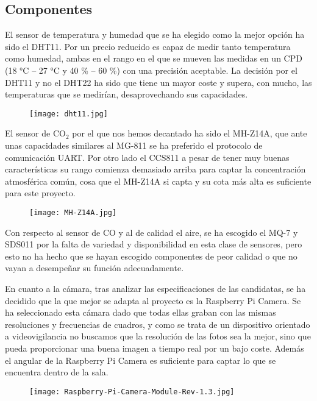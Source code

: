 \subsection{Componentes}\label{subsec:componentes}
El sensor de temperatura y humedad que se ha elegido como la mejor opción ha sido el DHT11. Por un precio reducido es capaz de medir tanto temperatura como humedad, ambas en el rango en el que se mueven las medidas en un CPD (18 °C -- 27 °C y  40 \% -- 60 \%) con una precisión aceptable. La decisión por el DHT11 y no el DHT22 ha sido que tiene un mayor coste y supera, con mucho, las temperaturas que se medirían, desaprovechando sus capacidades.
\begin{figure}[H]
	{\texttt{[image: dht11.jpg]}}\label{fig:dht11}
\end{figure}
El sensor de CO$_2$ por el que nos hemos decantado ha sido el MH-Z14A, que ante unas capacidades similares al MG-811 se ha preferido el protocolo de comunicación UART. Por otro lado el CCS811 a pesar de tener muy buenas características su rango comienza demasiado arriba para captar la concentración atmosférica común, cosa que el MH-Z14A si capta y su cota más alta es suficiente para este proyecto.
\begin{figure}[H]
	{\texttt{[image: MH-Z14A.jpg]}}\label{fig:mh-z14a}
\end{figure}
Con respecto al sensor de CO y al de calidad el aire, se ha escogido el MQ-7 y SDS011 por la falta de variedad y disponibilidad en esta clase de sensores, pero esto no ha hecho que se hayan escogido componentes de peor calidad o que no vayan a desempeñar su función adecuadamente.

En cuanto a la cámara, tras analizar las especificaciones de las candidatas, se ha decidido que la que mejor se adapta al proyecto es la Raspberry Pi Camera. Se ha seleccionado esta cámara dado que todas ellas graban con las mismas resoluciones y frecuencias de cuadros, y como se trata de un dispositivo orientado a videovigilancia no buscamos que la resolución de las fotos sea la mejor, sino que pueda proporcionar una buena imagen a tiempo real por un bajo coste. Además el angular de la Raspberry Pi Camera es suficiente para captar lo que se encuentra dentro de la sala.
\begin{figure}[H]
	{\texttt{[image: Raspberry-Pi-Camera-Module-Rev-1.3.jpg]}}\label{fig:moduloCamara}
\end{figure}

